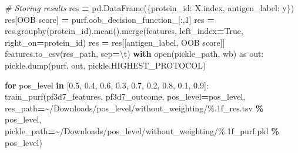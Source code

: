 \documentclass[
  11pt,
  oneside]{book}
\newenvironment{Shaded}{\begin{snugshade}}{\end{snugshade}}
\newcommand{\BuiltInTok}[1]{#1}
\newcommand{\CharTok}[1]{\textcolor[rgb]{0.31,0.60,0.02}{#1}}
\newcommand{\CommentTok}[1]{\textcolor[rgb]{0.56,0.35,0.01}{\textit{#1}}}
\newcommand{\ControlFlowTok}[1]{\textcolor[rgb]{0.13,0.29,0.53}{\textbf{#1}}}
\newcommand{\DecValTok}[1]{\textcolor[rgb]{0.00,0.00,0.81}{#1}}
\newcommand{\FloatTok}[1]{\textcolor[rgb]{0.00,0.00,0.81}{#1}}
\newcommand{\ImportTok}[1]{#1}
\newcommand{\KeywordTok}[1]{\textcolor[rgb]{0.13,0.29,0.53}{\textbf{#1}}}
\newcommand{\NormalTok}[1]{#1}
\newcommand{\OperatorTok}[1]{\textcolor[rgb]{0.81,0.36,0.00}{\textbf{#1}}}
\newcommand{\SpecialCharTok}[1]{\textcolor[rgb]{0.00,0.00,0.00}{#1}}
\newcommand{\StringTok}[1]{\textcolor[rgb]{0.31,0.60,0.02}{#1}}
\newcommand{\VariableTok}[1]{\textcolor[rgb]{0.00,0.00,0.00}{#1}}
\begin{document}
\begin{Shaded}
\begin{Highlighting}[]
    \CommentTok{\# Storing results}
\NormalTok{    res }\OperatorTok{=}\NormalTok{ pd.DataFrame(\{}\StringTok{\textquotesingle{}protein\_id\textquotesingle{}}\NormalTok{: X.index, }\StringTok{\textquotesingle{}antigen\_label\textquotesingle{}}\NormalTok{: y\})}
\NormalTok{    res[}\StringTok{\textquotesingle{}OOB score\textquotesingle{}}\NormalTok{] }\OperatorTok{=}\NormalTok{ purf.oob\_decision\_function\_[:,}\DecValTok{1}\NormalTok{]}
\NormalTok{    res }\OperatorTok{=}\NormalTok{ res.groupby(}\StringTok{\textquotesingle{}protein\_id\textquotesingle{}}\NormalTok{).mean().merge(features, left\_index}\OperatorTok{=}\VariableTok{True}\NormalTok{, right\_on}\OperatorTok{=}\StringTok{\textquotesingle{}protein\_id\textquotesingle{}}\NormalTok{)}
\NormalTok{    res }\OperatorTok{=}\NormalTok{ res[[}\StringTok{\textquotesingle{}antigen\_label\textquotesingle{}}\NormalTok{, }\StringTok{\textquotesingle{}OOB score\textquotesingle{}}\NormalTok{]]}
\NormalTok{    features.to\_csv(res\_path, sep}\OperatorTok{=}\StringTok{\textquotesingle{}}\CharTok{\textbackslash{}t}\StringTok{\textquotesingle{}}\NormalTok{)}
    \ControlFlowTok{with} \BuiltInTok{open}\NormalTok{(pickle\_path, }\StringTok{\textquotesingle{}wb\textquotesingle{}}\NormalTok{) }\ImportTok{as}\NormalTok{ out:}
\NormalTok{        pickle.dump(purf, out, pickle.HIGHEST\_PROTOCOL)}
\end{Highlighting}
\end{Shaded}

\begin{Shaded}
\begin{Highlighting}[]
\ControlFlowTok{for}\NormalTok{ pos\_level }\KeywordTok{in}\NormalTok{ [}\FloatTok{0.5}\NormalTok{, }\FloatTok{0.4}\NormalTok{, }\FloatTok{0.6}\NormalTok{, }\FloatTok{0.3}\NormalTok{, }\FloatTok{0.7}\NormalTok{, }\FloatTok{0.2}\NormalTok{, }\FloatTok{0.8}\NormalTok{, }\FloatTok{0.1}\NormalTok{, }\FloatTok{0.9}\NormalTok{]:}
\NormalTok{    train\_purf(pf3d7\_features, pf3d7\_outcome, pos\_level}\OperatorTok{=}\NormalTok{pos\_level,}
\NormalTok{        res\_path}\OperatorTok{=}\StringTok{\textquotesingle{}\textasciitilde{}/Downloads/pos\_level/without\_weighting/}\SpecialCharTok{\%.1f}\StringTok{\_res.tsv\textquotesingle{}} \OperatorTok{\%}\NormalTok{ pos\_level,}
\NormalTok{        pickle\_path}\OperatorTok{=}\StringTok{\textquotesingle{}\textasciitilde{}/Downloads/pos\_level/without\_weighting/}\SpecialCharTok{\%.1f}\StringTok{\_purf.pkl\textquotesingle{}} \OperatorTok{\%}\NormalTok{ pos\_level)}
\end{Highlighting}
\end{Shaded}
\end{document}
